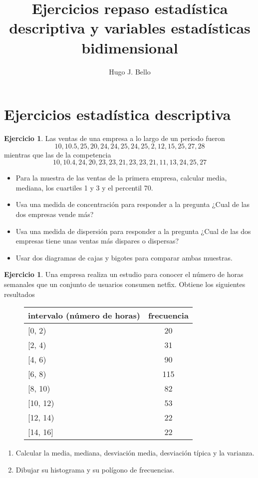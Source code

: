 \documentclass[]{article}
\title{Ejercicios repaso estadística descriptiva y variables estadísticas bidimensional}
\author{Hugo J. Bello}
\date{}
\providecommand{\tightlist}{%
  \setlength{\itemsep}{0pt}\setlength{\parskip}{0pt}}
\theoremstyle{plain}
\theoremstyle{definition}
\newtheorem{exercise}[theorem]{Ejercicio}
\theoremstyle{definition} %
\begin{document}
\maketitle
\section{Ejercicios estadística descriptiva}



\begin{exercise}
  Las ventas de una empresa a lo largo de un periodo fueron
  \[10, 10.5, 25, 20, 24, 24, 25, 24, 25, 2, 12, 15, 25, 27, 28\]
  mientras que las de la competencia
  \[10, 10.4, 24, 20, 23, 23, 21, 23, 23, 21, 11, 13, 24, 25, 27\]

  \begin{itemize}
  \tightlist
  \item
    Para la muestra de las ventas de la primera empresa, calcular media, mediana, los
    cuartiles 1 y 3 y el percentil 70.
  \item
    Usa una medida de concentración para responder a la pregunta ¿Cual de las dos empresas vende más?
  \item Usa una medida de dispersión para responder a la pregunta ¿Cual de las dos empresas tiene unas ventas más dispares o dispersas?
  \item
    Usar dos diagramas de cajas y bigotes para comparar ambas muestras.
  \end{itemize}
\end{exercise}

\begin{exercise}
Una empresa realiza un estudio para conocer el número de horas semanales que un conjunto de usuarios consumen netfix. 
Obtiene los siguientes resultados
\begin{figure}
  \centering
  \begin{tabular}{lc}
    intervalo (número de horas) & frecuencia\\
    \hline
    {[}0, 2) & 20    \\
    {[}2, 4) & 31    \\
    {[}4, 6) & 90    \\
    {[}6, 8) & 115   \\
    {[}8, 10) & 82   \\
    {[}10, 12) & 53  \\
    {[}12, 14) & 22 \\
    {[}14, 16] & 22
  \end{tabular}
\end{figure}
\begin{enumerate}
  \item
  Calcular la media, mediana, desviación media,  desviación típica y  la varianza.
\item
  Dibujar su histograma y su polígono de frecuencias.
\end{enumerate}
\end{exercise}
\end{document}
